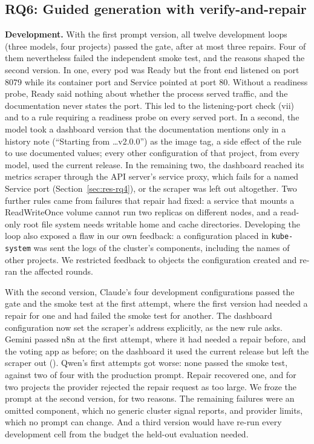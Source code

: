 
\subsection{RQ6: Guided generation with verify-and-repair}\label{sec:res-rq6}

\textbf{Development.} With the first prompt version, all twelve development loops (three models, four projects) passed the gate, after at most three repairs. Four of them nevertheless failed the independent smoke test, and the reasons shaped the second version. In one, every pod was Ready but the front end listened on port 8079 while its container port and Service pointed at port 80. Without a readiness probe, Ready said nothing about whether the process served traffic, and the documentation never states the port. This led to the listening-port check (vii) and to a rule requiring a readiness probe on every served port. In a second, the model took a dashboard version that the documentation mentions only in a history note (``Starting from \ldots v2.0.0'') as the image tag, a side effect of the rule to use documented values; every other configuration of that project, from every model, used the current release. In the remaining two, the dashboard reached its metrics scraper through the API server's service proxy, which fails for a named Service port (Section~\ref{sec:res-rq4}), or the scraper was left out altogether. Two further rules came from failures that repair had fixed: a service that mounts a ReadWriteOnce volume cannot run two replicas on different nodes, and a read-only root file system needs writable home and cache directories. Developing the loop also exposed a flaw in our own feedback: a configuration placed in \texttt{kube-system} was sent the logs of the cluster's components, including the names of other projects. We restricted feedback to objects the configuration created and re-ran the affected rounds.

With the second version, Claude's four development configurations passed the gate and the smoke test at the first attempt, where the first version had needed a repair for one and had failed the smoke test for another. The dashboard configuration now set the scraper's address explicitly, as the new rule asks. Gemini passed n8n at the first attempt, where it had needed a repair before, and the voting app as before; on the dashboard it used the current release but left the scraper out (). Qwen's first attempts got worse: none passed the smoke test, against two of four with the production prompt. Repair recovered one, and for two projects the provider rejected the repair request as too large. We froze the prompt at the second version, for two reasons. The remaining failures were an omitted component, which no generic cluster signal reports, and provider limits, which no prompt can change. And a third version would have re-run every development cell from the budget the held-out evaluation needed.

